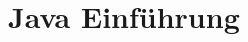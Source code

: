 \documentclass[18pt]{beamer}
\begin{document}
\section{Java Einführung}
\begin{frame}
\end{frame}

\appendix
\beginbackup


\backupend
\end{document}
